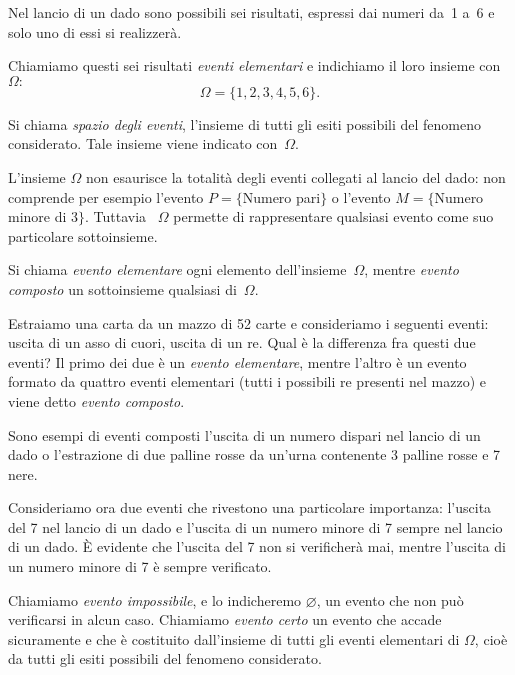 Nel lancio di un dado sono possibili sei risultati, espressi dai numeri 
da~1 a~6 e solo uno di essi si realizzerà.

Chiamiamo questi sei risultati \emph{eventi elementari} e indichiamo il 
loro insieme con 
\(\Omega:\) 
\[\Omega =\{1,2,3,4,5,6\}.\]

\begin{definizione}
Si chiama \emph{spazio degli eventi}, l'insieme di tutti gli esiti 
possibili del fenomeno considerato. 
Tale insieme viene indicato con~\(\Omega\).
\end{definizione}

L'insieme \(\Omega \) non esaurisce la totalità degli eventi collegati al 
lancio del dado: non comprende per esempio 
l'evento \(P=\{\)Numero pari\(\}\) o 
l'evento \(M=\{\)Numero minore di \(3\}\). 
Tuttavia~ \(\Omega \) permette di rappresentare qualsiasi evento come suo 
particolare sottoinsieme.

\begin{definizione}
Si chiama \emph{evento elementare} ogni elemento 
dell'insieme~\(\Omega\), 
mentre \emph{evento composto} un sottoinsieme qualsiasi di~\(\Omega\).
\end{definizione}

Estraiamo una carta da un mazzo di 52 carte e consideriamo i seguenti 
eventi: 
uscita di un asso di cuori, uscita di un re. Qual è la differenza fra 
questi due eventi? 
Il primo dei due è un \emph{evento elementare}, mentre l'altro è un 
evento formato da quattro eventi elementari (tutti i possibili re presenti 
nel mazzo) e viene detto \emph{evento composto}.

Sono esempi di eventi composti l'uscita di un numero dispari nel lancio di 
un dado o l'estrazione di due palline rosse da un'urna contenente 3 palline 
rosse e 7 nere.

Consideriamo ora due eventi che rivestono una particolare importanza: 
l'uscita del 7 nel lancio di un dado e l'uscita di un numero minore di 7 
sempre nel lancio di un dado. 
È evidente che l'uscita del 7 non si verificherà mai, 
mentre l'uscita di un numero minore di 7 è sempre verificato.

\begin{definizione}
Chiamiamo \emph{evento impossibile}, e lo indicheremo \(\varnothing\), un 
evento che non può verificarsi in alcun caso.
Chiamiamo \emph{evento certo} un evento che accade sicuramente e che è 
costituito dall'insieme di tutti gli eventi elementari di \(\Omega \), cioè 
da tutti gli esiti possibili del fenomeno considerato.
\end{definizione}


